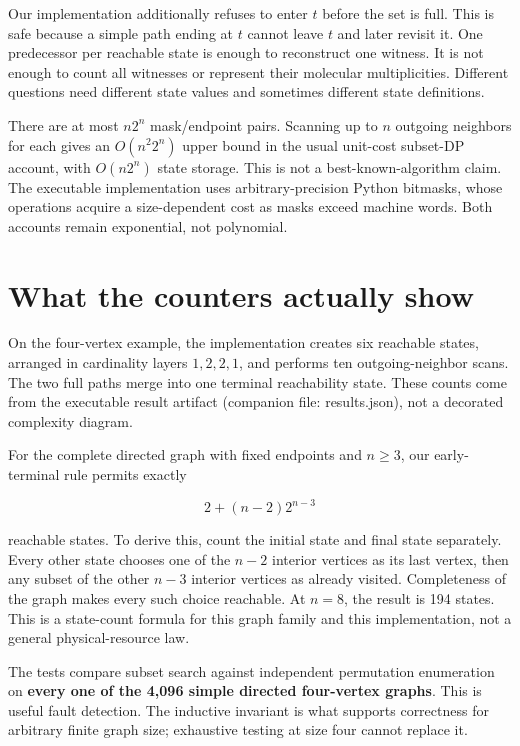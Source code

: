 Our implementation additionally refuses to enter \(t\) before the set is
full. This is safe because a simple path ending at \(t\) cannot leave
\(t\) and later revisit it. One predecessor per reachable state is
enough to reconstruct one witness. It is not enough to count all
witnesses or represent their molecular multiplicities. Different
questions need different state values and sometimes different state
definitions.

There are at most \(n2^n\) mask/endpoint pairs. Scanning up to \(n\)
outgoing neighbors for each gives an \(O(n^2 2^n)\) upper bound in the
usual unit-cost subset-DP account, with \(O(n2^n)\) state storage. This
is not a best-known-algorithm claim. The executable implementation uses
arbitrary-precision Python bitmasks, whose operations acquire a
size-dependent cost as masks exceed machine words. Both accounts remain
exponential, not polynomial.

\section{What the counters actually
show}\label{what-the-counters-actually-show}

On the four-vertex example, the implementation creates six reachable
states, arranged in cardinality layers \(1,2,2,1\), and performs ten
outgoing-neighbor scans. The two full paths merge into one terminal
reachability state. These counts come from the executable result
artifact (companion file: results.json), not a decorated complexity
diagram.

For the complete directed graph with fixed endpoints and \(n\ge3\), our
early-terminal rule permits exactly

\begin{equation}
2+(n-2)2^{n-3}
\end{equation}

reachable states. To derive this, count the initial state and final
state separately. Every other state chooses one of the \(n-2\) interior
vertices as its last vertex, then any subset of the other \(n-3\)
interior vertices as already visited. Completeness of the graph makes
every such choice reachable. At \(n=8\), the result is 194 states. This
is a state-count formula for this graph family and this implementation,
not a general physical-resource law.

The tests compare subset search against independent permutation
enumeration on \textbf{every one of the 4,096 simple directed
four-vertex graphs}. This is useful fault detection. The inductive
invariant is what supports correctness for arbitrary finite graph size;
exhaustive testing at size four cannot replace it.

